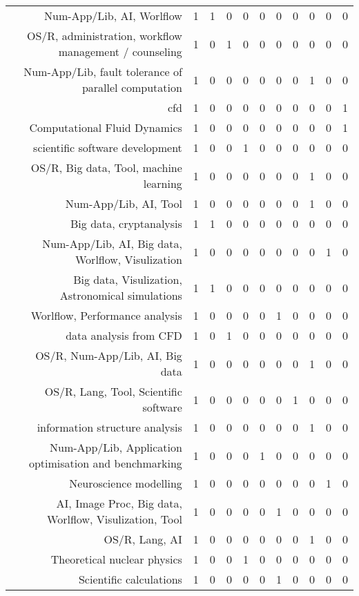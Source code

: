 {\begin{landscape}
\begin{longtable}[htb]{r|c|c|c|c|c|c|c|c|c|c}
{Num-App/Lib, AI, Worlflow} & 1 & 1 & 0 & 0 & 0 & 0 & 0 & 0 & 0 & 0 \\%
{OS/R, administration, workflow management / counseling} & 1 & 0 & 1 & 0 & 0 & 0 & 0 & 0 & 0 & 0 \\%
{Num-App/Lib, fault tolerance of parallel computation} & 1 & 0 & 0 & 0 & 0 & 0 & 0 & 1 & 0 & 0 \\%
{cfd} & 1 & 0 & 0 & 0 & 0 & 0 & 0 & 0 & 0 & 1 \\%
{Computational Fluid Dynamics} & 1 & 0 & 0 & 0 & 0 & 0 & 0 & 0 & 0 & 1 \\%
{scientific software development} & 1 & 0 & 0 & 1 & 0 & 0 & 0 & 0 & 0 & 0 \\%
{OS/R, Big data, Tool, machine learning} & 1 & 0 & 0 & 0 & 0 & 0 & 0 & 1 & 0 & 0 \\%
{Num-App/Lib, AI, Tool} & 1 & 0 & 0 & 0 & 0 & 0 & 0 & 1 & 0 & 0 \\%
{Big data, cryptanalysis} & 1 & 1 & 0 & 0 & 0 & 0 & 0 & 0 & 0 & 0 \\%
{Num-App/Lib, AI, Big data, Worlflow, Visulization} & 1 & 0 & 0 & 0 & 0 & 0 & 0 & 0 & 1 & 0 \\%
{Big data, Visulization, Astronomical simulations} & 1 & 1 & 0 & 0 & 0 & 0 & 0 & 0 & 0 & 0 \\%
{Worlflow, Performance analysis} & 1 & 0 & 0 & 0 & 0 & 1 & 0 & 0 & 0 & 0 \\%
{data analysis from CFD} & 1 & 0 & 1 & 0 & 0 & 0 & 0 & 0 & 0 & 0 \\%
{OS/R, Num-App/Lib, AI, Big data} & 1 & 0 & 0 & 0 & 0 & 0 & 0 & 1 & 0 & 0 \\%
{OS/R, Lang, Tool, Scientific software} & 1 & 0 & 0 & 0 & 0 & 0 & 1 & 0 & 0 & 0 \\%
{information structure analysis} & 1 & 0 & 0 & 0 & 0 & 0 & 0 & 1 & 0 & 0 \\%
{Num-App/Lib, Application optimisation and benchmarking} & 1 & 0 & 0 & 0 & 1 & 0 & 0 & 0 & 0 & 0 \\%
{Neuroscience modelling} & 1 & 0 & 0 & 0 & 0 & 0 & 0 & 0 & 1 & 0 \\%
{AI, Image Proc, Big data, Worlflow, Visulization, Tool} & 1 & 0 & 0 & 0 & 0 & 1 & 0 & 0 & 0 & 0 \\%
{OS/R, Lang, AI} & 1 & 0 & 0 & 0 & 0 & 0 & 0 & 1 & 0 & 0 \\%
{Theoretical nuclear physics} & 1 & 0 & 0 & 1 & 0 & 0 & 0 & 0 & 0 & 0 \\%
{Scientific calculations} & 1 & 0 & 0 & 0 & 0 & 1 & 0 & 0 & 0 & 0 \\%

\end{longtable}
\end{landscape}}

